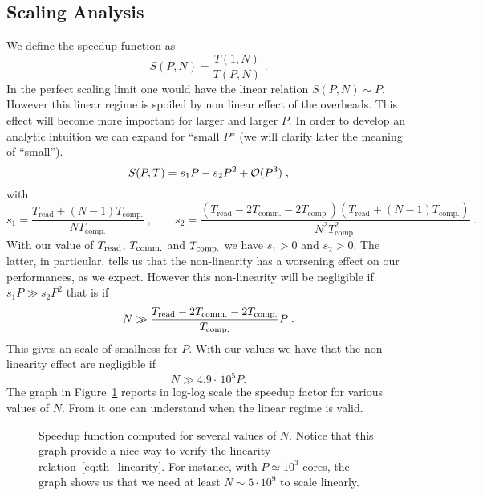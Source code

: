 \documentclass[11pt,a4paper]{article}
\newcommand{\f}{\frac}
\newcommand{\mc}{\ensuremath{\mathcal}}
\newcommand{\mr}{\ensuremath{\mathrm}}
\numberwithin{equation}{section}
\begin{document}
\subsection{Scaling Analysis}
We define the speedup function as
\begin{equation}
    S(P,N) = \f{T(1,N)}{T(P,N)}\;.
\end{equation}
In the perfect scaling limit one would have the linear relation $S(P,N) \sim P$. However this linear regime is spoiled by non linear effect of the overheads. This effect will become more important for larger and larger $P$. In order to develop an analytic intuition we can expand for ``small $P$'' (we will clarify later the meaning of ``small'').
\begin{equation}
    S(P,T) = s_1 P - s_2 P^2 + \mc{O}(P^3)\;,
\end{equation}
with
\begin{equation}
s_1 = \frac{T_{\text{read}}+(N-1)T_{\text{comp.}}}{N T_{\text{comp.}}}\;,\qquad s_2 = \frac{(T_{\text{read}}-2T_{\text{comm.}}-2T_{\text{comp.}})(T_{\text{read}}+(N-1)T_{\text{comp.}})}{N^2 T^2_{\text{comp.}}}\;.
\end{equation}
With our value of $T_{\mr{read}}$, $T_{\mr{comm.}}$ and $T_{\mr{comp.}}$ we have $s_1 > 0$ and $s_2 > 0$. The latter, in particular, tells us that the non-linearity has a worsening effect on our performances, as we expect. However this non-linearity will be negligible if $s_1 P \gg s_2 P^2$ that is if
\begin{equation}
    N \gg \f{T_{\mr{read}} - 2T_{\mr{comm.}} - 2T_{\mr{comp.}}}{T_{\mr{comp.}}}P\;.
\end{equation}
This gives an scale of smallness for $P$. With our values we have that the non-linearity effect are negligible if 
\begin{equation}\label{eq:th_linearity}
N \gg 4.9 \cdot\, 10^5 P.  
\end{equation}
The graph in Figure~\ref{fig:th_mod_3} reports in log-log scale the speedup factor for various values of $N$. From it one can understand when the linear regime is valid.

\begin{figure}[htb]
    \centering
    
    \caption{Speedup function computed for several values of $N$. Notice that this graph provide a nice way to verify the linearity relation~\eqref{eq:th_linearity}. For instance, with $P \simeq 10^3$ cores, the graph shows us that we need at least $N \sim 5 \cdot 10^9$ to scale linearly.}
    \label{fig:th_mod_3}
\end{figure}
\end{document}
